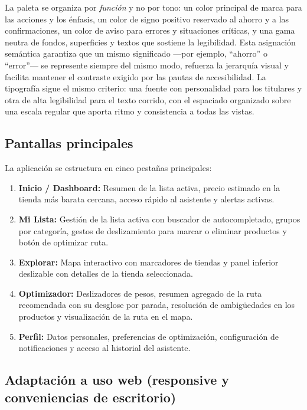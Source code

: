 La paleta se organiza por \emph{funci\'on} y no por tono: un color principal de marca para las
acciones y los \'enfasis, un color de signo positivo reservado al ahorro y a las confirmaciones, un
color de aviso para errores y situaciones cr\'iticas, y una gama neutra de fondos, superficies y
textos que sostiene la legibilidad. Esta asignaci\'on sem\'antica garantiza que un mismo significado
---por ejemplo, ``ahorro'' o ``error''--- se represente siempre del mismo modo, refuerza la jerarqu\'ia
visual y facilita mantener el contraste exigido por las pautas de accesibilidad. La tipograf\'ia
sigue el mismo criterio: una fuente con personalidad para los titulares y otra de alta legibilidad
para el texto corrido, con el espaciado organizado sobre una escala regular que aporta ritmo y
consistencia a todas las vistas.

\subsection{Pantallas principales}\label{subsec:pantallas}

La aplicaci\'on se estructura en cinco pesta\~nas principales:

\begin{enumerate}
  \item \textbf{Inicio / Dashboard:} Resumen de la lista activa, precio estimado en la tienda
    m\'as barata cercana, acceso r\'apido al asistente y alertas activas.
  \item \textbf{Mi Lista:} Gesti\'on de la lista activa con buscador de autocompletado, grupos
    por categor\'ia, gestos de deslizamiento para marcar o eliminar productos y bot\'on de
    optimizar ruta.
  \item \textbf{Explorar:} Mapa interactivo con marcadores de tiendas y panel inferior
    deslizable con detalles de la tienda seleccionada.
  \item \textbf{Optimizador:} Deslizadores de pesos, resumen agregado de la ruta recomendada con su
    desglose por parada, resoluci\'on de ambig\"uedades en los productos y visualizaci\'on de la
    ruta en el mapa.
  \item \textbf{Perfil:} Datos personales, preferencias de optimizaci\'on, configuraci\'on de
    notificaciones y acceso al historial del asistente.
\end{enumerate}

\subsection{Adaptaci\'on a uso web (responsive y conveniencias de escritorio)}\label{subsec:adaptacion-web}

